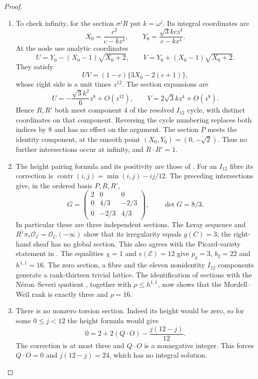 \begin{proof}
\begin{enumerate}[label=\arabic*.,leftmargin=*]
\item To check infinity, for the section
$\sigma^jR$ put $k=\omega^j$. Its
integral coordinates are
\[
 X_0=\frac{c^2}{c-kz^4},\qquad
 Y_0=\frac{\sqrt3kc z^4}{c-kz^4}.
\]
At the node use analytic coordinates
\[
 U=Y_0-(X_0-1)\sqrt{X_0+2},\qquad
 V=Y_0+(X_0-1)\sqrt{X_0+2}.
\]
They satisfy
\[
 UV=(1-c)\{3X_0-2(c+1)\},
\]
whose right side is a unit times $z^{12}$.
The section expansions are
\[
 U=-\frac{\sqrt3k^2}{6}z^8+O(z^{12}),
 \qquad V=2\sqrt3kz^4+O(z^8).
\]
Hence $R,R'$ both meet component $4$
of the resolved $I_{12}$ cycle, with
distinct coordinates on that component.
Reversing the cycle numbering replaces
both indices by $8$ and has no effect
on the argument. The section $P$ meets
the identity component, at the smooth
point $(X_0,Y_0)=(0,-\sqrt2)$.
Thus no further intersections occur at
infinity, and $R\cdot R'=1$.

\item The height pairing formula and its
positivity are those of
\cite[Theorems 8.4 and 8.6, table (8.16)]{Shioda90}.
For an $I_{12}$ fibre its correction is
$\operatorname{contr}(i,j)=\min(i,j)-ij/12$.
The preceding intersections give, in
the ordered basis $P,R,R'$,
\[
 G=\begin{pmatrix}
 2&0&0\\
 0&4/3&-2/3\\
 0&-2/3&4/3
 \end{pmatrix},\qquad \det G=8/3.
\]
In particular these are three independent
sections. The Leray sequence and
$R^1\pi_*\mathcal O_{\mathscr E}
=\mathcal O_C(-\infty)$ show that its
irregularity equals $g(C)=3$; the
right-hand sheaf has no global section.
This also agrees with the Picard-variety
statement in \cite[Theorem 4.1]{Shioda90}.
The equalities $\chi=1$ and
$e(\mathscr E)=12$ give $p_g=3$,
$b_2=22$ and $h^{1,1}=16$.
The zero section, a fibre and the eleven
nonidentity $I_{12}$ components generate
a rank-thirteen trivial lattice.
The identification of sections with
the N\'eron--Severi quotient
\cite[Theorem 1.3]{Shioda90}, together
with $\rho\le h^{1,1}$, now shows that
the Mordell--Weil rank is exactly three
and $\rho=16$.

\item There is no nonzero torsion section.
Indeed its height would be zero, so
for some $0\le j<12$ the height formula
would give
\[
 0=2+2(Q\cdot O)-\frac{j(12-j)}{12}.
\]
The correction is at most three and
$Q\cdot O$ is a nonnegative integer.
This forces $Q\cdot O=0$ and
$j(12-j)=24$, which has no integral
solution.


\end{enumerate}
\end{proof}
